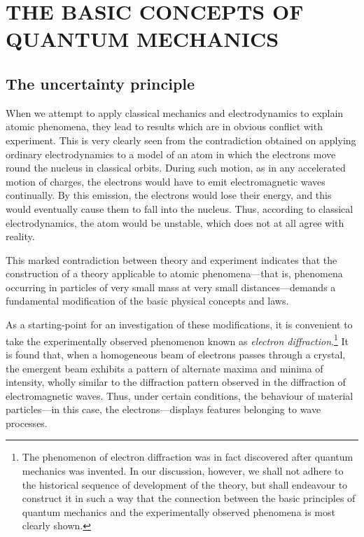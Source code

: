 \chapter{THE BASIC CONCEPTS OF QUANTUM MECHANICS}
\section{The uncertainty principle}\label{The uncertainty principle}
When we attempt to apply classical mechanics and electrodynamics to explain atomic phenomena, they lead to results which are in obvious conflict with experiment. This is very clearly seen from the contradiction obtained on applying ordinary electrodynamics to a model of an atom in which the electrons move round the nucleus in classical orbits. During such motion, as in any accelerated motion of charges, the electrons would have to emit electromagnetic waves continually. By this emission, the electrons would lose their energy, and this would eventually cause them to fall into the nucleus. Thus, according to classical electrodynamics, the atom would be unstable, which does not at all agree with reality.


This marked contradiction between theory and experiment indicates that the construction of a theory applicable to atomic phenomena—that is, phenomena occurring in particles of very small mass at very small distances—demands a fundamental modification of the basic physical concepts and laws.


As a starting-point for an investigation of these modifications, it is convenient to take the experimentally observed phenomenon known as \textit{electron diffraction}.\footnote{The phenomenon of electron diffraction was in fact discovered after quantum mechanics was invented. In our discussion, however, we shall not adhere to the historical sequence of development of the theory, but shall endeavour to construct it in such a way that the connection between the basic principles of quantum mechanics and the experimentally observed phenomena is most clearly shown.
} It is found that, when a homogeneous beam of electrons passes through a crystal, the emergent beam exhibits a pattern of alternate maxima and minima of intensity, wholly similar to the diffraction pattern observed in the diffraction of electromagnetic waves. Thus, under certain conditions, the behaviour of material particles—in this case, the electrons—displays features belonging to wave processes.


